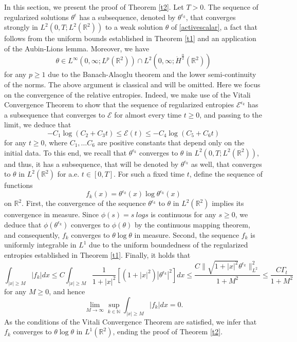 \documentclass[12pt,reqno]{amsart}
\newcommand{\be}{\begin{equation}}
\newcommand{\ee}{\end{equation}}
\newcommand{\N}{\mathbb N}
\newcommand{\R}{\mathbb R}
\begin{document}
In this section, we present the proof of Theorem \ref{t2}. 
Let $T > 0$. The sequence of regularized solutions $\theta^{\epsilon}$ has a subsequence, denoted by $\theta^{\epsilon_k}$, that converges strongly in $L^2(0,T; L^2(\R^2))$ to a weak solution $\theta$ of \eqref{activescalar}, a fact that follows from the uniform bounds established in Theorem \ref{t1} and an application of the Aubin-Lions lemma. Moreover, we have 
\be 
\theta \in L^{\infty}(0, \infty; L^p(\R^2)) \cap L^2(0, \infty; \dot{H}^{\frac{\alpha}{2}}(\R^2))
\ee for any $p \ge 1$ due to the Banach-Alaoglu theorem and the lower semi-continuity of the norms. The above argument is classical and will be omitted. Here we focus on the convergence of the relative entropies. Indeed, we make use of the Vitali Convergence Theorem to show that the sequence of regularized entropies $\mathcal{E}^{\epsilon_k}$ has a subsequence that converges to $\mathcal{E}$ for almost every time $t \ge 0$, and passing to the limit, we deduce that 
\be 
-C_1 \log (C_2+C_3t) \le \mathcal{E}(t) \le - C_4 \log (C_5+C_6t)
\ee for any $t \ge 0$, where $C_1, \dots C_6$  are positive constants that depend only on the initial data. To this end,  we recall that $\theta^{\epsilon_k}$ converges to $\theta$ in $L^2(0,T; L^2(\R^2))$, and thus, it has a subsequence, that will be denoted by $\theta^{\epsilon_k}$ as well, that converges to $\theta$ in $L^2(\R^2)$ for a.e. $t \in [0, T]$. For such a fixed time $t$, define the sequence of functions
\be 
f_k(x) = \theta^{\epsilon_k}(x) \log \theta^{\epsilon_k}(x)
\ee on $\R^2$. First, the convergence of the sequence $\theta^{\epsilon_k}$ to $\theta$ in $L^2(\R^2)$ implies its convergence in measure. Since $\phi(s) = s\ log s$ is continuous for any $s \ge 0$, we deduce that $\phi(\theta^{\epsilon_k})$ converges to $\phi(\theta)$ by the continuous mapping theorem, and consequently, $f_k$ converges to $\theta \log\theta$ in measure. Second, the sequence $f_k$ is uniformly integrable in $L^1$ due to the uniform boundedness of the regularized entropies established in Theorem \ref{t1}. Finally, it holds that 
\be 
\int_{|x| \ge M} |f_k| dx
\le C\int_{|x| \ge M} \frac{1}{1+|x|^2}\left[(1+|x|^2)|\theta^{\epsilon_k}|^2 \right] dx
\le \frac{C\|\sqrt{1+|x|^2}\theta^{\epsilon_k}\|_{L^2}^2}{1+M^2} \le \frac{C\Gamma_t}{1+M^2}
\ee for any $M \ge 0$, and hence 
\be 
\lim\limits_{M \to \infty} \sup\limits_{k \in \N} \int_{|x| \ge M} |f_k| dx = 0. 
\ee As the conditions of the Vitali Convergence Theorem are satisfied, we infer that $f_k$ converges to $\theta \log \theta$ in $L^1(\R^2)$, ending the proof of Theorem \ref{t2}. 
\end{document}
